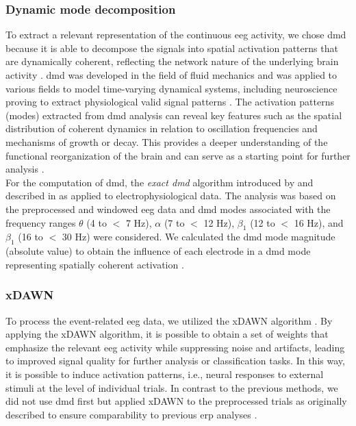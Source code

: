 \subsubsection{Dynamic mode decomposition}
To extract a relevant representation of the continuous \gls{eeg} activity, we chose \gls{dmd} because it is able to decompose the signals into spatial activation patterns that are dynamically coherent, reflecting the network nature of the underlying brain activity \cite{Brunton2016}. \Gls{dmd} was developed in the field of fluid mechanics and was applied to various fields to model time-varying dynamical systems, including neuroscience proving to extract physiological valid signal patterns \cite{Brunton2016, Kunert-Graf2019, Schmid2010, Schmid2008}. The activation patterns (modes) extracted from \gls{dmd} analysis can reveal key features such as the spatial distribution of coherent dynamics in relation to oscillation frequencies and mechanisms of growth or decay. This provides a deeper understanding of the functional reorganization of the brain and can serve as a starting point for further analysis \cite{Brunton2016}.\\
For the computation of \gls{dmd}, the \textit{exact \gls{dmd}} algorithm introduced by \citeauthor{Tu2014} \cite{Tu2014} and described in \cite{Brunton2016} as applied to electrophysiological data. The analysis was based on the preprocessed and windowed \gls{eeg} data and \gls{dmd} modes associated with the frequency ranges $\theta$ (4 to $<$ 7 Hz), $\alpha$ (7 to $<$ 12 Hz), $\beta_1$ (12 to $<$ 16 Hz), and $\beta_1$ (16 to $<$ 30 Hz) were considered. We calculated the \gls{dmd} mode magnitude (absolute value) to obtain the influence of each electrode in a \gls{dmd} mode representing spatially coherent activation \cite{Brunton2016}.

\subsubsection{xDAWN}
To process the event-related \gls{eeg} data, we utilized the xDAWN algorithm \cite{rivet2009xdawn}. By applying the xDAWN algorithm, it is possible to obtain a set of weights that emphasize the relevant \gls{eeg} activity while suppressing noise and artifacts, leading to improved signal quality for further analysis or classification tasks. In this way, it is possible to induce activation patterns, i.e., neural responses to external stimuli at the level of individual trials. In contrast to the previous methods, we did not use \gls{dmd} first but applied xDAWN to the preprocessed trials as originally described to ensure comparability to previous \gls{erp} analyses \cite{Reuter2019}.

